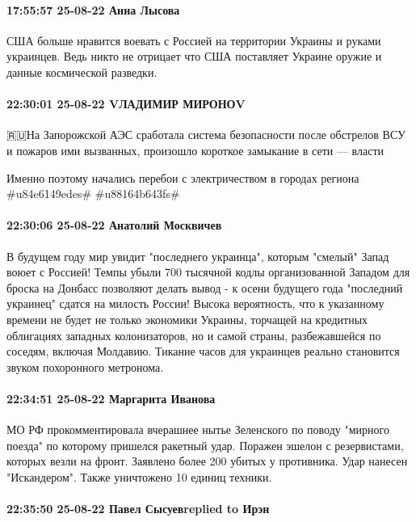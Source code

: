 \paragraph{17:55:57 25-08-22 Анна Лысова}

США больше нравится воевать с Россией на территории Украины и руками украинцев.
Ведь никто не отрицает что США поставляет Украине оружие и данные космической
разведки.


\paragraph{22:30:01 25-08-22 VЛАДИМИР МИРОНОV}

🇷🇺На Запорожской АЭС сработала система безопасности после обстрелов ВСУ и пожаров ими вызванных, произошло короткое замыкание в сети — власти

Именно поэтому начались перебои с электричеством в городах региона
#u84e6149edes# #u88164b643fs#

\paragraph{22:30:06 25-08-22 Анатолий Москвичев}

В будущем году мир увидит "последнего украинца", которым "смелый" Запад воюет с
Россией! Темпы убыли 700 тысячной кодлы организованной Западом для броска на
Донбасс позволяют делать вывод - к осени будущего года "последний украинец"
сдатся на милость России! Высока вероятность, что к указанному времени не будет
не только экономики Украины, торчащей на кредитных облигациях западных
колонизаторов, но и самой страны, разбежавшейся по соседям, включая Молдавию.
Тикание часов для украинцев реально становится звуком похоронного метронома.

\paragraph{22:34:51 25-08-22 Маргарита Иванова}

МО РФ прокомментировала вчерашнее нытье Зеленского по поводу "мирного поезда" по которому пришелся ракетный удар.
Поражен эшелон с резервистами, которых везли на фронт. Заявлено более 200 убитых у противника.
Удар нанесен "Искандером". Также уничтожено 10 единиц техники.

\paragraph{22:35:50 25-08-22 Павел Сысуевreplied to Ирэн}

